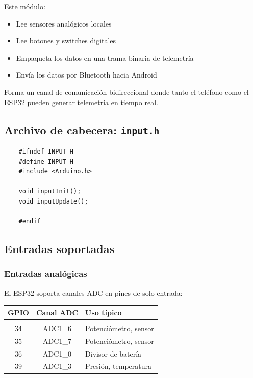 \documentclass[12pt,a4paper]{article}
\newcommand{\ardfnDG}[1]{\texttt{\textcolor{arduinoTeal}{#1}}}
\begin{document}
Este módulo:
\begin{itemize}
	\item Lee sensores analógicos locales
	\item Lee botones y switches digitales
	\item Empaqueta los datos en una trama binaria de telemetría
	\item Envía los datos por Bluetooth hacia Android
\end{itemize}

Forma un canal de comunicación bidireccional donde tanto el teléfono como
el ESP32 pueden generar telemetría en tiempo real.

\subsection{Archivo de cabecera: \ardfnDG{input.h}}

\begin{lstlisting}
	#ifndef INPUT_H
	#define INPUT_H
	#include <Arduino.h>
	
	void inputInit();
	void inputUpdate();
	
	#endif
\end{lstlisting}

\subsection{Entradas soportadas}

\subsubsection{Entradas analógicas}

El ESP32 soporta canales ADC en pines de solo entrada:

\begin{center}
	\renewcommand{\arraystretch}{1.3}
	\setlength{\tabcolsep}{12pt}
	
	\begin{tabular}{@{} c c l @{}}
		\toprule
		\rowcolor{tableHeader!20}
		\textbf{GPIO} & \textbf{Canal ADC} & \textbf{Uso típico}  \\
		\midrule
		
		\rowcolor{rowGray}
		\multicolumn{3}{l}{\textbf{Entradas ADC}}                      \\
		
		34            & ADC1\_6              & Potenciómetro, sensor \\
		35            & ADC1\_7              & Potenciómetro, sensor \\
		36            & ADC1\_0              & Divisor de batería    \\
		39            & ADC1\_3              & Presión, temperatura  \\
		
		\bottomrule
	\end{tabular}
\end{center}
\end{document}
